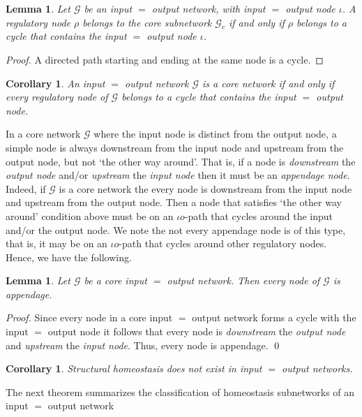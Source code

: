 \documentclass[a4paper,fleqn]{cas-dc}
\newtheorem{lemma}[theorem]{Lemma}
\newtheorem{corollary}[theorem]{Corollary}
\begin{document}
\begin{lemma}
Let $\mathcal{G}$ be an input $=$ output network, with input $=$ output node $\iota$.
A regulatory node $\rho$ belongs to the core subnetwork $\mathcal{G}_c$ if and only if $\rho$ belongs to a cycle that contains the input $=$ output node $\iota$.
\end{lemma}
\begin{proof}
A directed path starting and ending at the same node is a cycle.
\end{proof}

\begin{corollary}
An input $=$ output network $\mathcal{G}$ is a core network if and only if every regulatory node of $\mathcal{G}$ belongs to a cycle that contains the input $=$ output node.
\end{corollary}

In a core network $\mathcal{G}$ where the input node is distinct from the output node, a simple node is always downstream from the input node and upstream from the output node, but not `the other way around'. 
That is, if a node is \emph{downstream} the \emph{output node} and/or \emph{upstream} the \emph{input node} then it must be an \emph{appendage node}. 
Indeed, if $\mathcal{G}$ is a core network the every node is downstream from the input node and upstream from the output node. 
Then a node that satisfies `the other way around' condition above must be on an $\iota o$-path that cycles around the input and/or the output node. 
We note the not every appendage node is of this type, that is, it may be on an $\iota o$-path that cycles around other regulatory nodes.
Hence, we have the following.

\begin{lemma} \label{THM:APPENDAGE}
Let $\mathcal{G}$ be a core input $=$ output network.
Then every node of $\mathcal{G}$ is appendage.
\end{lemma}
\begin{proof}
Since every node in a core input $=$ output network forms a cycle with the input $=$ output node it follows that every node is \emph{downstream} the \emph{output node} and \emph{upstream} the \emph{input node}.
Thus, every node is appendage.
\qed
\end{proof}

\begin{corollary}
Structural homeostasis does not exist in input $=$ output networks.
\end{corollary}

The next theorem summarizes the classification of homeostasis subnetworks of an input $=$ output network
\end{document}
